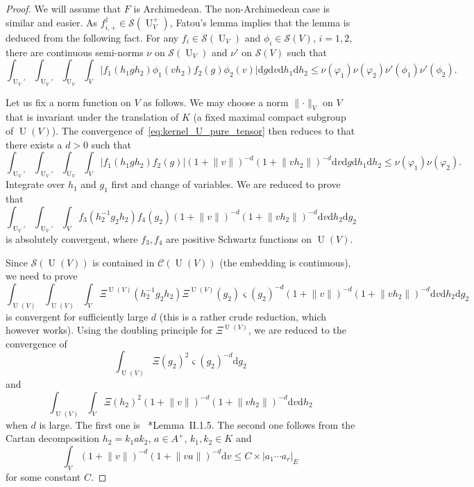 \documentclass[letterpaper,11pt]{amsart}
\newcommand{\cC}{\mathcal{C}}
\newcommand{\cS}{\mathcal{S}}
\newcommand{\rd}{\mathrm{d}}
\newcommand{\<}{\negthickspace}
\providecommand{\abs}[1]{\lvert#1\rvert}
\providecommand{\aabs}[1]{\lVert#1\rVert}
\DeclareMathOperator{\U}{U}
\theoremstyle{definition}
\theoremstyle{plain}
\theoremstyle{remark}
\numberwithin{equation}{section}
\begin{document}
\begin{proof}
We will assume that $F$ is Archimedean. The non-Archimedean case is similar
and easier. As $f_{i, +}^\ddag \in \cS(\U_V^+)$, Fatou's lemma implies that
the lemma is deduced from the following fact. For any $f_i \in \cS(\U_V)$ and
$\phi_i \in \cS(V)$, $i = 1, 2$, there are continuous semi-norms $\nu$ on
$\cS(\U_V)$ and $\nu'$ on $\cS(V)$ such that
    \begin{equation}    \label{eq:kernel_U_pure_tensor}
    \int_{\U_V'} \int_{\U_V'} \int_{\U_V} \int_{V}
    \abs{f_1(h_1g h_2) \phi_1(vh_2) f_2(g)\phi_2(v)}
    \rd g \rd v \rd h_1 \rd h_2
    \leq \nu(\varphi_1) \nu(\varphi_2) \nu'(\phi_1) \nu'(\phi_2).
    \end{equation}


Let us fix a norm function on $V$ as follows. We may choose a norm
$\aabs{\cdot}_V$ on $V$ that is invariant under the translation of $K$ (a
fixed maximal compact subgroup of $\U(V)$). The convergence
of~\eqref{eq:kernel_U_pure_tensor} then reduces to that there exists a $d>0$
such that
    \[
    \int_{\U_V'} \int_{\U_V'} \int_{\U_V} \int_V \abs{f_1(h_1g h_2) f_2(g)}
    (1+ \aabs{v})^{-d}
    (1+ \aabs{v h_2})^{-d} \rd v \rd g
    \rd h_1 \rd h_2
    \leq \nu(\varphi_1) \nu(\varphi_2).
    \]
Integrate over $h_1$ and $g_1$ first and change of variables. We are reduced to
prove that
    \[
    \int_{\U_V'} \int_{\U_V'} \int_V f_3(h_2^{-1} g_2 h_2) f_4(g_2)
    (1+ \aabs{v})^{-d}
    (1+ \aabs{v h_2})^{-d} \rd v \rd h_2 \rd g_2
    \]
is absolutely convergent,
where $f_3, f_4$ are positive Schwartz functions on $\U(V)$.

Since $\cS(\U(V))$ is contained in $\cC(\U(V))$ (the embedding is
continuous), we need to prove
    \[
    \int_{\U(V)} \int_{\U(V)} \int_V
    \Xi^{\U(V)}(h_2^{-1} g_2 h_2) \Xi^{\U(V)}(g_2) \varsigma(g_2)^{-d}
    (1+ \aabs{v})^{-d}
    (1+ \aabs{v h_2})^{-d} \rd v \rd h_2 \rd g_2
    \]
is convergent for sufficiently large $d$ (this is a rather crude reduction,
which however works). Using the doubling principle for $\Xi^{\U(V)}$, we are
reduced to the convergence of
    \[
    \int_{\U(V)} \Xi(g_2)^2 \varsigma(g_2)^{-d} \rd g_2
    \]
and
    \[
    \int_{\U(V)} \int_V \Xi(h_2)^2
    (1+ \aabs{v})^{-d}
    (1+ \aabs{v h_2})^{-d} \rd v \rd h_2
    \]
when $d$ is large. The first one is ~\cite{Wald}*{Lemma~II.1.5}. The second
one follows from the Cartan decomposition $h_2 = k_1 a k_2$, $a \in A^+$,
$k_1, k_2 \in K$ and
    \[
    \int_V
    (1+ \aabs{v})^{-d}
    (1+ \aabs{v a})^{-d} \rd v \leq
    C \times \abs{a_1\cdots a_r}_E
    \]
for some constant $C$.
\end{proof}
\end{document}
